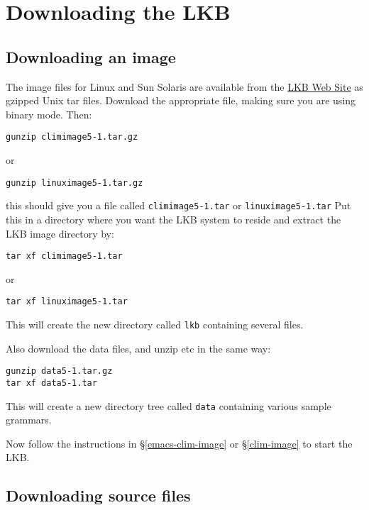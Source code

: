\documentclass[12pt]{report}
\newcommand{\filename}[1]{{\tt #1}}
\begin{document}
\section{Downloading the LKB}
\label{down}

\subsection{Downloading an image}
\label{down-images}

The image files for Linux and Sun Solaris are available from the
\href{http://www-csli.stanford.edu/~aac/lkb.html}{LKB Web Site}
as gzipped Unix tar files.
Download the appropriate file, making sure you are using binary mode.
Then:
\begin{verbatim}
gunzip climimage5-1.tar.gz
\end{verbatim}
or
\begin{verbatim}
gunzip linuximage5-1.tar.gz
\end{verbatim}
this should give you a file called \filename{climimage5-1.tar} or
\filename{linuximage5-1.tar}
Put this in a directory where you want the LKB system to reside
and extract the LKB image directory by:
\begin{verbatim}
tar xf climimage5-1.tar
\end{verbatim}
or
\begin{verbatim}
tar xf linuximage5-1.tar
\end{verbatim}
This will create the new directory called \filename{lkb} containing
several files. 

Also download the data files, and unzip etc in the same way:
\begin{verbatim}
gunzip data5-1.tar.gz
tar xf data5-1.tar
\end{verbatim}
This will create a new directory tree called \filename{data} containing
various sample grammars.

Now follow the instructions in \S\ref{emacs-clim-image}
or \S\ref{clim-image}
to start the LKB.


\subsection{Downloading source files}
\label{down-src}
\end{document}
